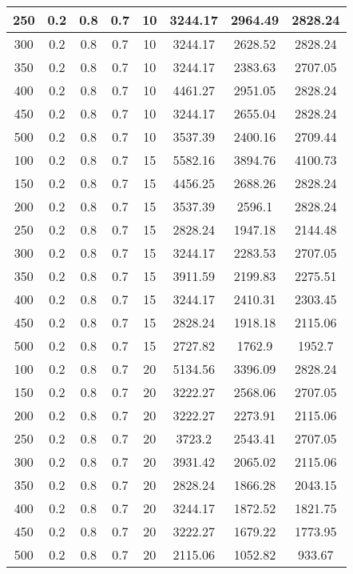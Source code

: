 \documentclass[a4paper, 12pt]{extreport}
\begin{document}
\begin{itemize}
\begin{longtable}{|c|c|c|c|c|c|c|c|}
			250 & 0.2 & 0.8 & 0.7 & 10 & 3244.17 & 2964.49 & 2828.24 \\\hline
			300 & 0.2 & 0.8 & 0.7 & 10 & 3244.17 & 2628.52 & 2828.24 \\\hline
			350 & 0.2 & 0.8 & 0.7 & 10 & 3244.17 & 2383.63 & 2707.05 \\\hline
			400 & 0.2 & 0.8 & 0.7 & 10 & 4461.27 & 2951.05 & 2828.24 \\\hline
			450 & 0.2 & 0.8 & 0.7 & 10 & 3244.17 & 2655.04 & 2828.24 \\\hline
			500 & 0.2 & 0.8 & 0.7 & 10 & 3537.39 & 2400.16 & 2709.44 \\\hline
			100 & 0.2 & 0.8 & 0.7 & 15 & 5582.16 & 3894.76 & 4100.73 \\\hline
			150 & 0.2 & 0.8 & 0.7 & 15 & 4456.25 & 2688.26 & 2828.24 \\\hline
			200 & 0.2 & 0.8 & 0.7 & 15 & 3537.39 & 2596.1 & 2828.24 \\\hline
			250 & 0.2 & 0.8 & 0.7 & 15 & 2828.24 & 1947.18 & 2144.48 \\\hline
			300 & 0.2 & 0.8 & 0.7 & 15 & 3244.17 & 2283.53 & 2707.05 \\\hline
			350 & 0.2 & 0.8 & 0.7 & 15 & 3911.59 & 2199.83 & 2275.51 \\\hline
			400 & 0.2 & 0.8 & 0.7 & 15 & 3244.17 & 2410.31 & 2303.45 \\\hline
			450 & 0.2 & 0.8 & 0.7 & 15 & 2828.24 & 1918.18 & 2115.06 \\\hline
			500 & 0.2 & 0.8 & 0.7 & 15 & 2727.82 & 1762.9 & 1952.7 \\\hline
			100 & 0.2 & 0.8 & 0.7 & 20 & 5134.56 & 3396.09 & 2828.24 \\\hline
			150 & 0.2 & 0.8 & 0.7 & 20 & 3222.27 & 2568.06 & 2707.05 \\\hline
			200 & 0.2 & 0.8 & 0.7 & 20 & 3222.27 & 2273.91 & 2115.06 \\\hline
			250 & 0.2 & 0.8 & 0.7 & 20 & 3723.2 & 2543.41 & 2707.05 \\\hline
			300 & 0.2 & 0.8 & 0.7 & 20 & 3931.42 & 2065.02 & 2115.06 \\\hline
			350 & 0.2 & 0.8 & 0.7 & 20 & 2828.24 & 1866.28 & 2043.15 \\\hline
			400 & 0.2 & 0.8 & 0.7 & 20 & 3244.17 & 1872.52 & 1821.75 \\\hline
			450 & 0.2 & 0.8 & 0.7 & 20 & 3222.27 & 1679.22 & 1773.95 \\\hline
			500 & 0.2 & 0.8 & 0.7 & 20 & 2115.06 & 1052.82 & 933.67 \\\hline

\end{longtable}
\end{itemize}
\end{document}
